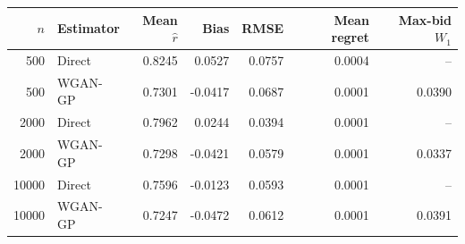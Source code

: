 \begin{tabular}{rlrrrrr}
\toprule
$n$ & Estimator & Mean $\widehat r$ & Bias & RMSE & Mean regret & Max-bid $W_1$ \\
\midrule
500 & Direct & 0.8245 & 0.0527 & 0.0757 & 0.0004 & -- \\
500 & WGAN-GP & 0.7301 & -0.0417 & 0.0687 & 0.0001 & 0.0390 \\
2000 & Direct & 0.7962 & 0.0244 & 0.0394 & 0.0001 & -- \\
2000 & WGAN-GP & 0.7298 & -0.0421 & 0.0579 & 0.0001 & 0.0337 \\
10000 & Direct & 0.7596 & -0.0123 & 0.0593 & 0.0001 & -- \\
10000 & WGAN-GP & 0.7247 & -0.0472 & 0.0612 & 0.0001 & 0.0391 \\
\bottomrule
\end{tabular}
